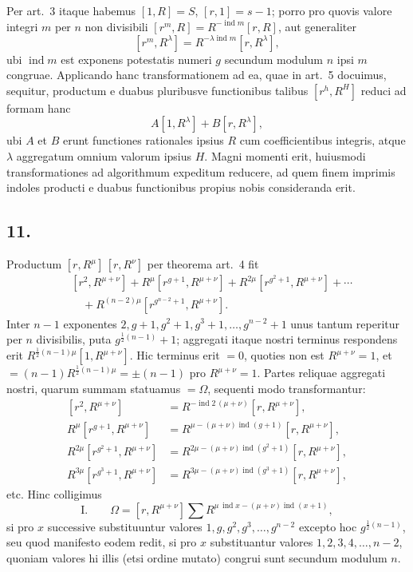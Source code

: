 \documentclass[12pt]{article}
\begin{document}
Per art.~3 itaque habemus $[1,R]=S$, $[r,1]=s-1$; porro pro quovis valore integri $m$ per $n$ non divisibili $[r^m,R]=R^{-\operatorname{ind}m}[r,R]$, aut generaliter
\[
[r^m,R^\lambda]=R^{-\lambda\operatorname{ind}m}[r,R^\lambda],
\]
ubi $\operatorname{ind}m$ est exponens potestatis numeri $g$ secundum modulum $n$ ipsi $m$ congruae. Applicando hanc transformationem ad ea, quae in art.~5 docuimus, sequitur, productum e duabus pluribusve functionibus talibus $[r^h,R^H]$ reduci ad formam hanc
\[
A[1,R^\lambda]+B[r,R^\lambda],
\]
ubi $A$ et $B$ erunt functiones rationales ipsius $R$ cum coefficientibus integris, atque $\lambda$ aggregatum omnium valorum ipsius $H$. Magni momenti erit, huiusmodi transformationes ad algorithmum expeditum reducere, ad quem finem imprimis indoles producti e duabus functionibus propius nobis consideranda erit.

\subsection*{11.}

Productum $[r,R^\mu]\,[r,R^\nu]$ per theorema art.~4 fit
\[
\begin{aligned}
{}&[r^2,R^{\mu+\nu}]
+R^\mu[r^{g+1},R^{\mu+\nu}]
+R^{2\mu}[r^{g^2+1},R^{\mu+\nu}]
+\cdots\\
&\quad+R^{(n-2)\mu}[r^{g^{n-2}+1},R^{\mu+\nu}].
\end{aligned}
\]
Inter $n-1$ exponentes $2,g+1,g^2+1,g^3+1,\ldots,g^{n-2}+1$ unus tantum reperitur per $n$ divisibilis, puta $g^{\frac12(n-1)}+1$; aggregati itaque nostri terminus respondens erit $R^{\frac12(n-1)\mu}[1,R^{\mu+\nu}]$. Hic terminus erit $=0$, quoties non est $R^{\mu+\nu}=1$, et $=(n-1)R^{\frac12(n-1)\mu}=\pm(n-1)$ pro $R^{\mu+\nu}=1$. Partes reliquae aggregati nostri, quarum summam statuamus $=\Omega$, sequenti modo transformantur:
\[
\begin{aligned}
[r^2,R^{\mu+\nu}]&=R^{-\operatorname{ind}2\,(\mu+\nu)}[r,R^{\mu+\nu}],\\
R^\mu[r^{g+1},R^{\mu+\nu}]&=R^{\mu-(\mu+\nu)\operatorname{ind}(g+1)}[r,R^{\mu+\nu}],\\
R^{2\mu}[r^{g^2+1},R^{\mu+\nu}]&=R^{2\mu-(\mu+\nu)\operatorname{ind}(g^2+1)}[r,R^{\mu+\nu}],\\
R^{3\mu}[r^{g^3+1},R^{\mu+\nu}]&=R^{3\mu-(\mu+\nu)\operatorname{ind}(g^3+1)}[r,R^{\mu+\nu}],
\end{aligned}
\]
etc. Hinc colligimus
\[
\text{I.}\qquad
\Omega=[r,R^{\mu+\nu}]\sum R^{\mu\,\operatorname{ind}x-(\mu+\nu)\operatorname{ind}(x+1)},
\]
si pro $x$ successive substituuntur valores $1,g,g^2,g^3,\ldots,g^{n-2}$ excepto hoc $g^{\frac12(n-1)}$, seu quod manifesto eodem redit, si pro $x$ substituantur valores $1,2,3,4,\ldots,n-2$, quoniam valores hi illis (etsi ordine mutato) congrui sunt secundum modulum $n$.
\end{document}
